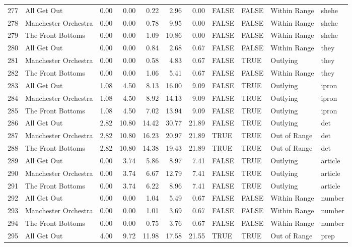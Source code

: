 \begin{table}[ht]
\begin{tabular}{rlrrrrrllll}
  277 & All Get Out & 0.00 & 0.00 & 0.22 & 2.96 & 0.00 & FALSE & FALSE & Within Range & shehe \\ 
  278 & Manchester Orchestra & 0.00 & 0.00 & 0.78 & 9.95 & 0.00 & FALSE & FALSE & Within Range & shehe \\ 
  279 & The Front Bottoms & 0.00 & 0.00 & 1.09 & 10.86 & 0.00 & FALSE & FALSE & Within Range & shehe \\ 
  280 & All Get Out & 0.00 & 0.00 & 0.84 & 2.68 & 0.67 & FALSE & FALSE & Within Range & they \\ 
  281 & Manchester Orchestra & 0.00 & 0.00 & 0.58 & 4.83 & 0.67 & FALSE & TRUE & Outlying & they \\ 
  282 & The Front Bottoms & 0.00 & 0.00 & 1.06 & 5.41 & 0.67 & FALSE & FALSE & Within Range & they \\ 
  283 & All Get Out & 1.08 & 4.50 & 8.13 & 16.00 & 9.09 & FALSE & TRUE & Outlying & ipron \\ 
  284 & Manchester Orchestra & 1.08 & 4.50 & 8.92 & 14.13 & 9.09 & FALSE & TRUE & Outlying & ipron \\ 
  285 & The Front Bottoms & 1.08 & 4.50 & 7.02 & 13.94 & 9.09 & FALSE & TRUE & Outlying & ipron \\ 
  286 & All Get Out & 2.82 & 10.80 & 14.42 & 30.77 & 21.89 & FALSE & TRUE & Outlying & det \\ 
  287 & Manchester Orchestra & 2.82 & 10.80 & 16.23 & 20.97 & 21.89 & TRUE & TRUE & Out of Range & det \\ 
  288 & The Front Bottoms & 2.82 & 10.80 & 14.38 & 19.43 & 21.89 & TRUE & TRUE & Out of Range & det \\ 
  289 & All Get Out & 0.00 & 3.74 & 5.86 & 8.97 & 7.41 & FALSE & TRUE & Outlying & article \\ 
  290 & Manchester Orchestra & 0.00 & 3.74 & 6.67 & 12.79 & 7.41 & FALSE & TRUE & Outlying & article \\ 
  291 & The Front Bottoms & 0.00 & 3.74 & 6.22 & 8.96 & 7.41 & FALSE & TRUE & Outlying & article \\ 
  292 & All Get Out & 0.00 & 0.00 & 1.04 & 5.49 & 0.67 & FALSE & FALSE & Within Range & number \\ 
  293 & Manchester Orchestra & 0.00 & 0.00 & 1.01 & 3.69 & 0.67 & FALSE & FALSE & Within Range & number \\ 
  294 & The Front Bottoms & 0.00 & 0.00 & 0.75 & 3.76 & 0.67 & FALSE & FALSE & Within Range & number \\ 
  295 & All Get Out & 4.00 & 9.72 & 11.98 & 17.58 & 21.55 & TRUE & TRUE & Out of Range & prep \\ 

\end{tabular}
\end{table}
